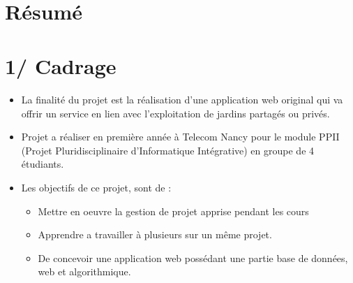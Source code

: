 \documentclass{report}
\begin{document}
\newpage

\begin{center}
    \textbf{\color{orange}{\Huge Charte-projet}} \\
    \textbf{\color{blue}{\Large Table des matières}}
\end{center}

\section*{Résumé}
\section*{1/ Cadrage}
\begin{itemize}
    \item La finalité du projet est la réalisation d'une application web original qui va offrir un service en lien avec l’exploitation de jardins partagés ou privés.
    \item Projet a réaliser en première année à Telecom Nancy pour le module PPII (Projet Pluridisciplinaire d'Informatique Intégrative) en groupe de 4 étudiants.
    \item Les objectifs de ce projet, sont de :  
    \begin{itemize}
        \item Mettre en oeuvre la gestion de projet apprise pendant les cours
        \item Apprendre a travailler à plusieurs sur un même projet.
        \item De concevoir une application web possédant une partie base de données, web et algorithmique.
    \end{itemize}

\end{itemize}
\end{document}
